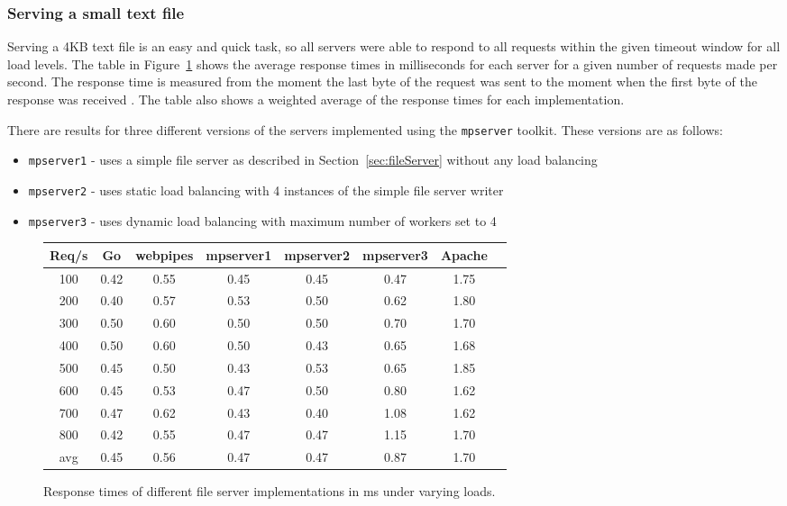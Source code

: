 \subsubsection{Serving a small text file}
Serving a 4KB text file is an easy and quick task, so all servers were able to
respond to all requests within the given timeout window for all load levels.
The table in Figure~\ref{results} shows the average response times in milliseconds 
for each server for a given number of requests made per second. The response time is 
measured from the moment the last byte of the request was sent to the moment when the first 
byte of the response was received \cite{httperfdoc}. The table also shows a weighted 
average of the response times for each implementation.

There are results for three different versions of the servers implemented using 
the \texttt{mpserver} toolkit. These versions are as follows:
\begin{itemize}
	\item \texttt{mpserver1} - uses a simple file server as 
		  described in Section~\ref{sec:fileServer} without any load balancing

	\item \texttt{mpserver2} - uses static load balancing with 4 instances
		  of the simple file server writer

	\item \texttt{mpserver3} - uses dynamic load balancing with maximum number of 
		  workers set to 4
\end{itemize}

\begin{figure}[h]
\begin{center}
\begin{tabular}{|c|c|c|c|c|c|c|c|}
\hline
Req/s & Go & webpipes & mpserver1 & mpserver2 & mpserver3 & Apache\\
\hline
100 & 0.42 & 0.55 & 0.45 & 0.45 & 0.47 & 1.75 \\
200 & 0.40 & 0.57 & 0.53 & 0.50 & 0.62 & 1.80 \\
300 & 0.50 & 0.60 & 0.50 & 0.50 & 0.70 & 1.70 \\
400 & 0.50 & 0.60 & 0.50 & 0.43 & 0.65 & 1.68 \\
500 & 0.45 & 0.50 & 0.43 & 0.53 & 0.65 & 1.85 \\
600 & 0.45 & 0.53 & 0.47 & 0.50 & 0.80 & 1.62 \\
700 & 0.47 & 0.62 & 0.43 & 0.40 & 1.08 & 1.62 \\
800 & 0.42 & 0.55 & 0.47 & 0.47 & 1.15 & 1.70 \\
\hline
avg & 0.45 & 0.56 &	0.47 & 0.47 & 0.87 & 1.70 \\
\hline
\end{tabular}
\end{center}
\caption{Response times of different file server implementations in ms under varying loads.}
\label{results}
\end{figure}

